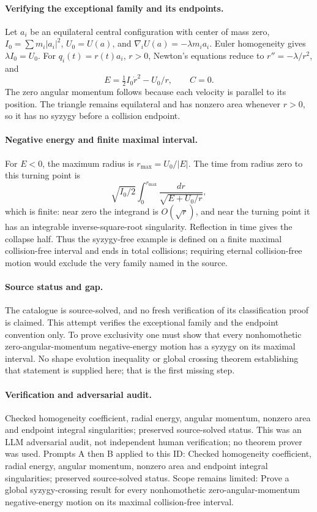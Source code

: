\documentclass[11pt]{article}
\begin{document}
\paragraph{Verifying the exceptional family and its endpoints.}Let \(a_i\) be an equilateral central configuration with center of mass zero, \(I_0=\sum m_i|a_i|^2\), \(U_0=U(a)\), and \(\nabla_iU(a)=-\lambda m_i a_i\). Euler homogeneity gives \(\lambda I_0=U_0\). For \(q_i(t)=r(t)a_i\), \(r>0\), Newton's equations reduce to \(r''=-\lambda/r^2\), and
\[E=\tfrac12I_0\dot r^2-U_0/r,\qquad C=0.
\]
The zero angular momentum follows because each velocity is parallel to its position. The triangle remains equilateral and has nonzero area whenever \(r>0\), so it has no syzygy before a collision endpoint.
\paragraph{Negative energy and finite maximal interval.}For \(E<0\), the maximum radius is \(r_{\max}=U_0/|E|\). The time from radius zero to this turning point is
\[\sqrt{I_0/2}\int_0^{r_{\max}}\frac{dr}{\sqrt{E+U_0/r}},
\]
which is finite: near zero the integrand is \(O(\sqrt r)\), and near the turning point it has an integrable inverse-square-root singularity. Reflection in time gives the collapse half. Thus the syzygy-free example is defined on a finite maximal collision-free interval and ends in total collisions; requiring eternal collision-free motion would exclude the very family named in the source.
\paragraph{Source status and gap.}The catalogue is source-solved, and no fresh verification of its classification proof is claimed. This attempt verifies the exceptional family and the endpoint convention only. To prove exclusivity one must show that every nonhomothetic zero-angular-momentum negative-energy motion has a syzygy on its maximal interval. No shape evolution inequality or global crossing theorem establishing that statement is supplied here; that is the first missing step.

\paragraph{Verification and adversarial audit.}
Checked homogeneity coefficient, radial energy, angular momentum, nonzero area and endpoint integral singularities; preserved source-solved status. This was an LLM adversarial audit, not independent human verification; no theorem prover was used. Prompts A then B applied to this ID: Checked homogeneity coefficient, radial energy, angular momentum, nonzero area and endpoint integral singularities; preserved source-solved status. Scope remains limited: Prove a global syzygy-crossing result for every nonhomothetic zero-angular-momentum negative-energy motion on its maximal collision-free interval.
\end{document}
